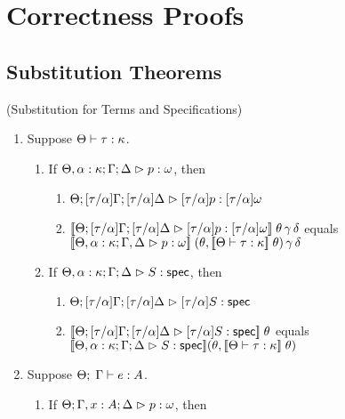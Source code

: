 \section{Correctness Proofs}

\subsection{Substitution Theorems}

\begin{lemma*}{(Substitution for Terms and Specifications)}
\begin{enumerate}
\item Suppose $\judgeWK{\tau}{\kappa}$.
  \begin{enumerate}
  \item If $\judgeA[\Theta, \alpha:\kappa; \Gamma; \Delta]{p}{\omega}$, 
        then 
        \begin{enumerate}
        \item $\judgeA[\Theta; {[\tau/\alpha]}\Gamma; {[\tau/\alpha]}\Delta]{{[\tau/\alpha]}p}{{[\tau/\alpha]}\omega}$
        \item $\interp{\judgeA[\Theta; {[\tau/\alpha]}\Gamma; {[\tau/\alpha]}\Delta]{{[\tau/\alpha]}p}{{[\tau/\alpha]}\omega}}\;\theta\,\gamma\,\delta$ equals \\
          $\interp{\judgeA[\Theta, \alpha:\kappa; \Gamma, \Delta]{p}{\omega}}\;(\theta,\interp{\judgeWK{\tau}{\kappa}}\;\theta)\,\gamma\,\delta$
        \end{enumerate}
  \item If $\judgeS[\Theta, \alpha:\kappa; \Gamma; \Delta]{S}$, 
        then 
        \begin{enumerate}
        \item $\judgeS[\Theta; {[\tau/\alpha]}\Gamma; {[\tau/\alpha]}\Delta]{{[\tau/\alpha]}S}$
        \item $\interp{\judgeS[\Theta; {[\tau/\alpha]}\Gamma; {[\tau/\alpha]}\Delta]{{[\tau/\alpha]}S}}\;\theta$ equals \\
              $\interp{\judgeS[\Theta, \alpha:\kappa; \Gamma; \Delta]{S}}(\theta, \interp{\judgeWK{\tau}{\kappa}}\;\theta)$
        \end{enumerate}
  \end{enumerate}
\item Suppose $\judgeE{\Gamma}{e}{A}$.
  \begin{enumerate}
  \item If $\judgeA[\Theta; \Gamma, x:A; \Delta]{p}{\omega}$, 
        then 
        \begin{enumerate}

\end{enumerate}
\end{enumerate}
\end{enumerate}
\end{lemma*}
